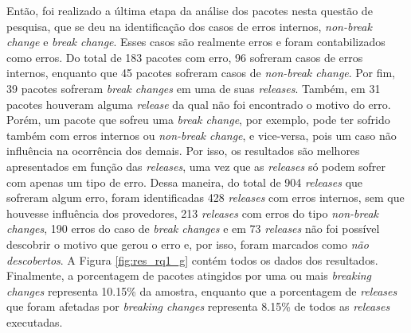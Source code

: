Então, foi realizado a última etapa da análise dos pacotes nesta questão de pesquisa, que se deu na identificação dos casos de erros internos, \textit{non-break change} e \textit{break change}.  Esses casos são realmente erros e foram contabilizados como erros. Do total de 183 pacotes com erro, 96 sofreram casos de erros internos, enquanto que 45 pacotes sofreram casos de \textit{non-break change}. Por fim, 39 pacotes sofreram \textit{break changes} em uma de suas \textit{releases}. Também, em 31 pacotes houveram alguma \textit{release} da qual não foi encontrado o motivo do erro. Porém, um pacote que sofreu uma \textit{break change}, por exemplo, pode ter sofrido também com erros internos ou \textit{non-break change}, e vice-versa, pois um caso não influência na ocorrência dos demais. Por isso, os resultados são melhores apresentados em função das \textit{releases}, uma vez que as \textit{releases} só podem sofrer com apenas um tipo de erro. Dessa maneira, do total de 904 \textit{releases} que sofreram algum erro, foram identificadas 428 \textit{releases} com erros internos, sem que houvesse influência dos provedores, 213 \textit{releases} com erros do tipo \textit{non-break changes}, 190 erros do caso de \textit{break changes} e em 73 \textit{releases} não foi possível descobrir o motivo que gerou o erro e, por isso, foram marcados como \textit{não descobertos}. A Figura \ref{fig:res_rq1_g} contém todos os dados dos resultados. Finalmente, a porcentagem de pacotes atingidos por uma ou mais \textit{breaking changes} representa 10.15\% da amostra, enquanto que a porcentagem de \textit{releases} que foram afetadas por \textit{breaking changes} representa 8.15\% de todos as \textit{releases} executadas. 

